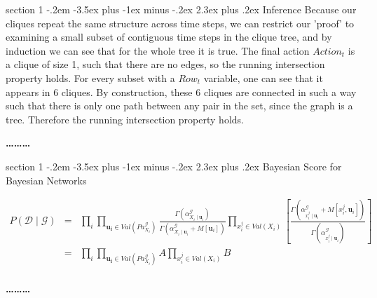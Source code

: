 \documentclass[12pt]{article}
\makeatletter
\newenvironment{problem}{\@startsection
       {section}
       {1}
       {-.2em}
       {-3.5ex plus -1ex minus -.2ex}
       {2.3ex plus .2ex}
       {\pagebreak[3]%
       \large\bf\noindent{Problem }
       }
       }
       {%
       \begin{center}\large\bf \ldots\ldots\ldots\end{center}}
\makeatother
\begin{document}
\begin{problem}{Inference}
Because our cliques repeat the same structure across time steps, 
we can restrict our 'proof' to examining a small subset of contiguous
time steps in the clique tree, and by induction we can see that for the
whole tree it is true.  The final action $Action_t$ is a clique of size 1,
such that there are no edges, so the running intersection property holds.
For every subset with a $Row_t$ variable, one can see that it appears in 
6 cliques.  By construction, these 6 cliques are connected in such a way
such that there is only one path between any pair in the set, since the
graph is a tree.  Therefore the running intersection property holds.



\end{problem}{}

\begin{problem}{Bayesian Score for Bayesian Networks}

\begin{eqnarray*}
P( \mathcal{D} \mid \mathcal{G}) & = & 
\prod_i \prod _{\mathbf{u_{i}} \in Val(Pa^{\mathcal{G}}_{X_{i}})} 
\frac{\Gamma(\alpha^{\mathcal{G}}_{X_{i}\mid \mathbf{u}_{i}})}{\Gamma(\alpha^{\mathcal{G}}_{X_{i}\mid \mathbf{u}_{i}} + M[ \mathbf{u}_{i}])} 
\prod_{x_{i}^{j} \in Val(X_{i})} 
\left[ \frac{\Gamma(\alpha^{\mathcal{G}}_{x_{i}^{j}\mid \mathbf{u}_{i}} + M[ x_{i}^{j},\mathbf{u}_{i}])}{\Gamma(\alpha^{\mathcal{G}}_{x_{i}^{j}\mid \mathbf{u}_{i}} )} \right]\\
& = & 
\prod_i \prod _{\mathbf{u_{i}} \in Val(Pa^{\mathcal{G}}_{X_{i}})} 
A
\prod_{x_{i}^{j} \in Val(X_{i})} 
B\\
\end{eqnarray*}


\end{problem}
\end{document}
